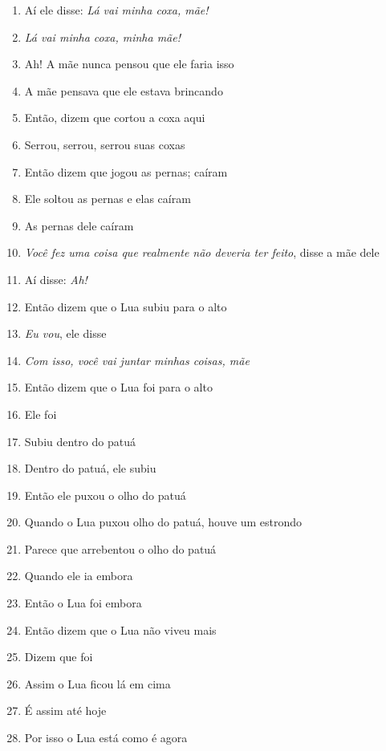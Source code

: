 \begin{enumerate}
\begin{center}\end{center}

\item Aí ele disse: \textit{Lá vai minha coxa, mãe!}
\item \textit{Lá vai minha coxa, minha mãe!}
\item Ah! A mãe nunca pensou que ele faria isso
\item A mãe pensava que ele estava brincando
\item Então, dizem que cortou a coxa aqui
\item Serrou, serrou, serrou suas coxas
\item Então dizem que jogou as pernas; caíram
\item Ele soltou as pernas e elas caíram
\item As pernas dele caíram
\item \textit{Você fez uma coisa que realmente não deveria ter feito}, disse a mãe dele
\item Aí disse: \textit{Ah!}

\begin{center}\end{center}

\item Então dizem que o Lua subiu para o alto
\item \textit{Eu vou}, ele disse
\item \textit{Com isso, você vai juntar minhas coisas, mãe}
\item Então dizem que o Lua foi para o alto
\item Ele foi
\item Subiu dentro do patuá
\item Dentro do patuá, ele subiu
\item Então ele puxou o olho do patuá
\item Quando o Lua puxou olho do patuá, houve um estrondo
\item Parece que arrebentou o olho do patuá
\item Quando ele ia embora

\begin{center}\end{center}

\item Então o Lua foi embora
\item Então dizem que o Lua não viveu mais
\item Dizem que foi
\item Assim o Lua ficou lá em cima
\item É assim até hoje
\item Por isso o Lua está como é agora


\end{enumerate}
